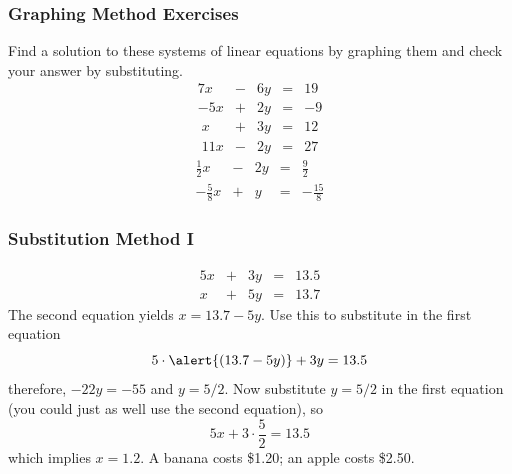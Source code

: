 \documentclass[xcolor=dvipsnames]{beamer}
\begin{document}
\begin{frame}
  \frametitle{Graphing Method Exercises}
Find a solution to these systems of linear equations by graphing them
and check your answer by substituting.
  \begin{equation}
    \label{eq:fiesebah}
    \begin{array}{rcrcl}
      7x&-&6y&=&19 \\
      -5x&+&2y&=&-9
    \end{array}
  \end{equation}
  \begin{equation}
    \label{eq:weaseiwa}
    \begin{array}{rcrcl}
      x&+&3y&=&12 \\
      11x&-&2y&=&27
    \end{array}
  \end{equation}
  \begin{equation}
    \label{eq:yaetooni}
    \begin{array}{rcrcl}
      \frac{1}{2}x&-&2y&=&\frac{9}{2} \\
      -\frac{5}{8}x&+&y&=&-\frac{15}{8}
    \end{array}
  \end{equation}
\end{frame}

\begin{frame}
  \frametitle{Substitution Method I}
  \begin{equation}
    \label{eq:jichoora}
    \begin{array}{rcrcl}
      5x&+&3y&=&13.5 \\
      x&+&5y&=&13.7
    \end{array}
  \end{equation}
The second equation yields $x=13.7-5y$. Use this to substitute in the
first equation
  \begin{equation}
    \label{eq:iewoobih}
5\cdot\alert{(13.7-5y)}+3y=13.5
  \end{equation}
therefore, $-22y=-55$ and $y=5/2$. Now substitute $y=5/2$ in the first
equation (you could just as well use the second equation), so
\begin{equation}
  \label{eq:phaiyahj}
  5x+3\cdot\frac{5}{2}=13.5
\end{equation}
which implies $x=1.2$. A banana costs \$1.20; an apple costs \$2.50.
\end{frame}
\end{document}
